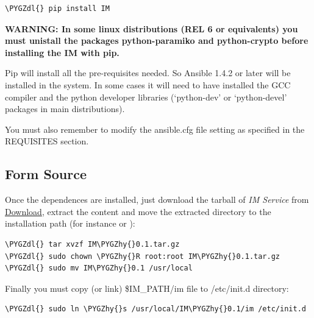 \documentclass[letterpaper,10pt,english]{sphinxmanual}
\def\PYGZdl{\char`\$}
\def\PYGZhy{\char`\-}
\begin{document}
\begin{Verbatim}[commandchars=\\\{\}]
\PYGZdl{} pip install IM
\end{Verbatim}

\textbf{WARNING: In some linux distributions (REL 6 or equivalents) you must unistall
the packages python-paramiko and python-crypto before installing the IM with pip.}

Pip will install all the pre-requisites needed. So Ansible 1.4.2 or later will be
installed in the system. In some cases it will need to have installed the GCC
compiler and the python developer libraries (`python-dev' or `python-devel'
packages in main distributions).

You must also remember to modify the ansible.cfg file setting as specified in the
REQUISITES section.


\subsection{Form Source}
\label{manual:form-source}
Once the dependences are installed, just download the tarball of \emph{IM Service}
from \href{http://www.grycap.upv.es/im/download.php}{Download}, extract the
content and move the extracted directory to the installation path (for instance
 or ):

\begin{Verbatim}[commandchars=\\\{\}]
\PYGZdl{} tar xvzf IM\PYGZhy{}0.1.tar.gz
\PYGZdl{} sudo chown \PYGZhy{}R root:root IM\PYGZhy{}0.1.tar.gz
\PYGZdl{} sudo mv IM\PYGZhy{}0.1 /usr/local
\end{Verbatim}

Finally you must copy (or link) \$IM\_PATH/im file to /etc/init.d directory:

\begin{Verbatim}[commandchars=\\\{\}]
\PYGZdl{} sudo ln \PYGZhy{}s /usr/local/IM\PYGZhy{}0.1/im /etc/init.d
\end{Verbatim}
\end{document}
